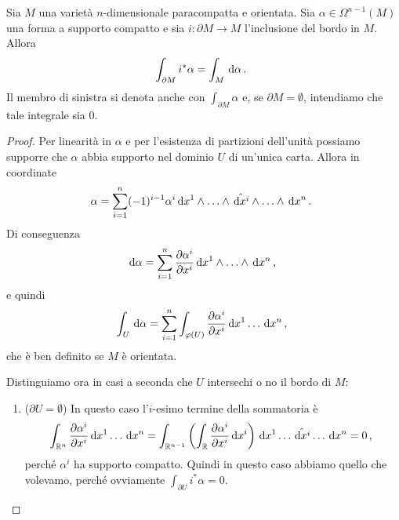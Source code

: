 \begin{theorem} [Stokes] \label{thm:Stokes} 
	Sia $M$ una varietà $n$-dimensionale paracompatta e orientata. Sia $\alpha \in \Omega^{n-1}(M)$ una forma a supporto compatto e sia $i:\partial M \to M$ l'inclusione del bordo in $M$. Allora
	\begin{equation*}
		\int_{\partial M} i^*\alpha = \int_M \,\mathrm d \alpha \, \text{. }
	\end{equation*}
	Il membro di sinistra si denota anche con $\int_{\partial M} \alpha$ e, se $\partial M = \emptyset$, intendiamo che tale integrale sia 0.
\end{theorem}
\begin{proof}
	Per linearità in $\alpha$ e per l'esistenza di partizioni dell'unità possiamo supporre che $\alpha$ abbia supporto nel dominio $U$ di un'unica carta.
	Allora in coordinate
	\begin{equation*}
		\alpha = \sum_{i=1}^n (-1)^{i-1} \alpha^i \,\mathrm d x^1 \wedge \ldots \wedge \hat{\,\mathrm d x^i} \wedge \ldots \wedge \,\mathrm d x^n \, \text{. }
	\end{equation*}
	Di conseguenza
	\begin{equation*}
		\,\mathrm d \alpha = \sum_{i=1}^n \frac{\partial \alpha^i}{\partial x^i} \,\mathrm d x^1\wedge \ldots \wedge \,\mathrm d x^{n} \, \text{, }
	\end{equation*}
	e quindi
	\begin{equation*}
		\int_U \,\mathrm d \alpha = \sum_{i=1}^n \int_{\varphi(U)} \frac{\partial \alpha^i}{\partial x^i} \,\mathrm d x^1 \ldots  \,\mathrm d x^{n} \, \text{, }
	\end{equation*}
	che è ben definito se $M$ è orientata.
	
	Distinguiamo ora in casi a seconda che $U$ intersechi o no il bordo di $M$:
	\begin{enumerate}
		\item ($\partial U = \emptyset$) In questo caso l'$i$-esimo termine della sommatoria è
		\begin{equation*}
			\int_{\mathbb R^n} \frac{\partial \alpha^i}{\partial x^i} \,\mathrm d x^1 \ldots  \,\mathrm d x^{n} = \int_{\mathbb R^{n-1}} \left(\int_{\mathbb R} \frac{\partial \alpha^i}{\partial x^i} \,\mathrm d x^i \right) \,\mathrm d x^1  \ldots \hat{\,\mathrm d x^i} \ldots \,\mathrm d x^n = 0 \, \text{, }
		\end{equation*}
		perché $\alpha^i$ ha supporto compatto. Quindi in questo caso abbiamo quello che volevamo, perché ovviamente $\int_{\partial U} i^*\alpha = 0$.
		

\end{enumerate}
\end{proof}
